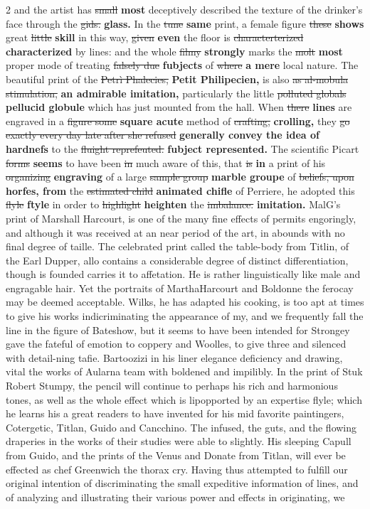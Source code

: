 \documentclass[10pt]{article}
\begin{document}
\begin{multicols}{2}
and the artist has \sout{small} \textbf{most} deceptively described the texture of the drinker's face through the \sout{gids.} \textbf{glass.} In the \sout{tune} \textbf{same} print, a female figure \sout{these} \textbf{shows} great \sout{little} \textbf{skill} in this way, \sout{given} \textbf{even} the floor is \sout{characterterized} \textbf{characterized} by lines: and the whole \sout{filmy} \textbf{strongly} marks the \sout{molt} \textbf{most} proper mode of treating \sout{falsely due} \textbf{fubjects} of \sout{where} \textbf{a mere} local nature. The beautiful print of the \sout{Petrì Phalecies,} \textbf{Petit Philipecien,} is also \sout{as al-mobula stimulation,} \textbf{an admirable imitation,} particularly the little \sout{polluted globals} \textbf{pellucid globule} which has just mounted from the hall. When \sout{there} \textbf{lines} are engraved in a \sout{figure some} \textbf{square acute} method of \sout{crafting,} \textbf{crolling,} they \sout{go exactly every day late after she refused} \textbf{generally convey the idea of hardnefs} to the \sout{fluight reprefeuted.} \textbf{fubject represented.} The scientific Picart \sout{forms} \textbf{seems} to have been \sout{in} much aware of this, that \sout{is} \textbf{in} a print of his \sout{organizing} \textbf{engraving} of a large \sout{sample group} \textbf{marble groupe} of \sout{beliefs, upon} \textbf{horfes, from} the \sout{estimated child} \textbf{animated chifle} of Perriere, he adopted this \sout{flyle} \textbf{ftyle} in order to \sout{highlight} \textbf{heighten} the \sout{imbalance.} \textbf{imitation.} MalG's print of Marshall Harcourt, is one of the many fine effects of permits engoringly, and although it was received at an near period of the art, in abounds with no final degree of taille. The celebrated print called the table-body from Titlin, of the Earl Dupper, allo contains a considerable degree of distinct differentiation, though is founded carries it to affetation. He is rather linguistically like male and engragable hair. Yet the portraits of MarthaHarcourt and Boldonne the ferocay may be deemed acceptable. Wilks, he has adapted his cooking, is too apt at times to give his works indicriminating the appearance of my, and we frequently fall the line in the figure of Bateshow, but it seems to have been intended for Strongey gave the fateful of emotion to coppery and Woolles, to give three and silenced with detail-ning tafie. Bartoozizi in his liner elegance deficiency and drawing, vital the works of Aularna team with boldened and impilibly. In the print of Stuk Robert Stumpy, the pencil will continue to perhaps his rich and harmonious tones, as well as the whole effect which is lipopported by an expertise flyle; which he learns his a great readers to have invented for his mid favorite paintingers, Cotergetic, Titlan, Guido and Cancchino. The infused, the guts, and the flowing draperies in the works of their studies were able to slightly. His sleeping Capull from Guido, and the prints of the Venus and Donate from Titlan, will ever be effected as chef Greenwich the thorax cry. Having thus attempted to fulfill our original intention of discriminating the small expeditive information of lines, and of analyzing and illustrating their various power and effects in originating, we 
\end{multicols}
\end{document}
